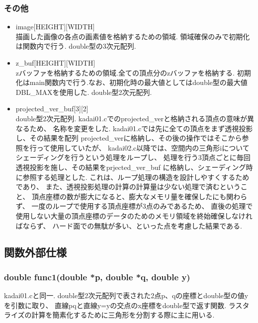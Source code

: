 \documentclass[a4j,dvipdfmx]{jsarticle}
\begin{document}
\subsubsection{その他}
\begin{itemize}
\item image[HEIGHT][WIDTH]\\
  描画した画像の各点の画素値を格納するための領域.
  領域確保のみで初期化は関数内で行う.
  double型の3次元配列.

\item z\_buf[HEIGHT][WIDTH]\\
  zバッファを格納するための領域.全ての頂点分のzバッファを格納する.
  初期化はmain関数内で行う.なお、初期化時の最大値としてはdouble型の最大値
  DBL\_MAXを使用した.
  double型2次元配列.
  
\item projected\_ver\_buf[3][2]\\
  double型2次元配列.
  kadai01.cでのprojected\_verと格納される頂点の意味が異なるため、
  名称を変更をした.
  kadai01.cでは先に全ての頂点をまず透視投影し、その結果を配列
  projected\_verに格納し、その後の操作ではそこから参照を行って使用していたが、
  kadai02.c以降では、空間内の三角形iについてシェーディングを行うという処理をループし、
  処理を行う3頂点ごとに毎回透視投影を施し、その結果をprjected\_ver\_buf
  に格納し、シェーディング時に参照する処理とした.
  これは、ループ処理の構造を設計しやすくするためであり、
  また、透視投影処理の計算の計算量は少ない処理で済むということ、
  頂点座標の数が膨大になると、膨大なメモリ量を確保したにも関わらず、
  一度のループで使用する頂点座標が3点のみであるため、
  直後の処理で使用しない大量の頂点座標のデータのためのメモリ領域を終始確保しなければならず、
  ハード面での無駄が多い、といった点を考慮した結果である.
\end{itemize}


\subsection{関数外部仕様}
\subsubsection{double func1(double *p, double *q, double y)}
kadai01.cと同一.
double型2次元配列で表された2点p、qの座標とdouble型の値yを引数に取り、
直線pqと直線y=yの交点のx座標をdouble型で返す関数.
ラスタライズの計算を簡素化するために三角形を分割する際に主に用いる.
\end{document}
